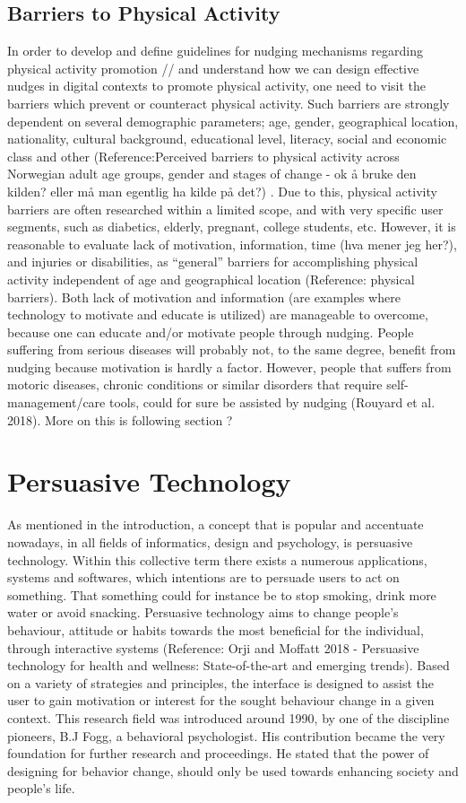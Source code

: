 \subsection{Barriers to Physical Activity} 
In order to develop and define guidelines for nudging mechanisms regarding physical activity promotion //  and understand how we can design effective nudges in digital contexts to promote physical activity, one need to visit the barriers which prevent or counteract physical activity. Such barriers are strongly dependent on several demographic parameters; age, gender, geographical location, nationality, cultural background, educational level, literacy, social and economic class and other (Reference:Perceived barriers to physical activity across Norwegian adult age groups, gender and stages of change - ok å bruke den kilden? eller må man egentlig ha kilde på det?) . Due to this, physical activity barriers are often researched within a limited scope, and with very specific user segments, such as diabetics, elderly, pregnant, college students, etc. However, it is reasonable to evaluate lack of motivation, information, time (hva mener jeg her?), and injuries or disabilities, as “general” barriers for accomplishing physical activity independent of age and geographical location (Reference: physical barriers). Both lack of motivation and information (are examples where technology to motivate and educate is utilized) are manageable to overcome, because one can educate and/or motivate people through nudging. People suffering from serious diseases will probably not, to the same degree, benefit from nudging because motivation is hardly a factor. However, people that suffers from motoric diseases, chronic conditions or similar disorders that require self-management/care tools, could for sure be assisted by nudging (Rouyard et al. 2018). More on this is following section ?

\section{Persuasive Technology}
As mentioned in the introduction, a concept that is popular and accentuate nowadays, in all fields of informatics, design and psychology, is persuasive technology. Within this collective term there exists a numerous applications, systems and softwares, which intentions are to persuade users to act on something. That something could for instance be to stop smoking, drink more water or avoid snacking. Persuasive technology aims to change people’s behaviour, attitude or habits towards the most beneficial for the individual, through interactive systems (Reference: Orji and Moffatt 2018 - Persuasive technology for health and wellness: State-of-the-art and emerging trends). Based on a variety of strategies and principles, the interface is designed to assist the user to gain motivation or interest for the sought behaviour change in a given context. This research field was introduced around 1990, by one of the discipline pioneers, B.J Fogg, a behavioral psychologist. His contribution became the very foundation for further research and proceedings. He stated that the power of designing for behavior change, should only be used towards enhancing society and people's life.

